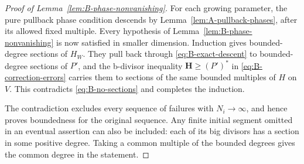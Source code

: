 \begin{proof}[Proof of Lemma~\ref{lem:B-phase-nonvanishing}]
For each growing parameter, the pure pullback phase
condition descends by Lemma~\ref{lem:A-pullback-phases},
after its allowed fixed multiple.  Every hypothesis of
Lemma~\ref{lem:B-phase-nonvanishing} is now satisfied in
smaller dimension.  Induction gives bounded-degree
sections of $H_W$.  They pull back through
\eqref{eq:B-exact-descent} to bounded-degree sections
of $P'$, and the b-divisor inequality
$\mathbf H\ge(P')^*$ in
\eqref{eq:B-correction-errors} carries them to sections
of the same bounded multiples of $H$ on $V$.
This contradicts \eqref{eq:B-no-sections} and completes
the induction.

The contradiction excludes every sequence of failures
with $N_i\to\infty$, and hence proves boundedness for
the original sequence.  Any finite initial segment
omitted in an eventual assertion can also be included:
each of its big divisors has a section in some positive
degree.  Taking a common multiple of the bounded
degrees gives the common degree in the statement.
\end{proof}
